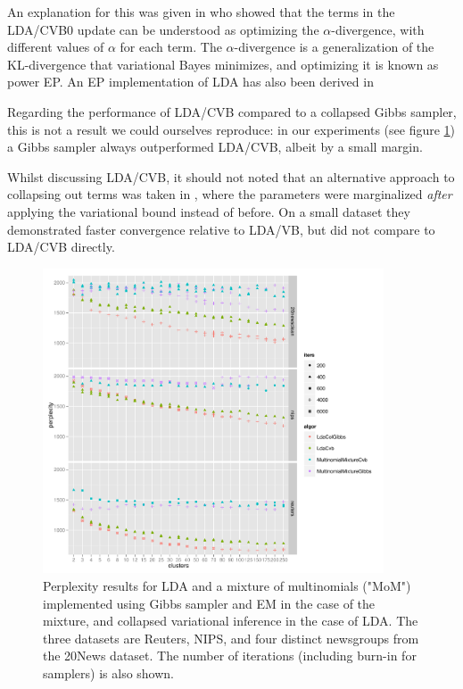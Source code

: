 An explanation for this was given in\cite{Sato2012} who showed that the terms in the LDA/CVB0 update can be understood as optimizing the $\alpha$-divergence\cite{Minka2005}, with different values of $\alpha$ for each term. The $\alpha$-divergence is a generalization of the KL-divergence that variational Bayes minimizes, and optimizing it is known as power EP. An EP implementation of LDA has also been derived in \cite{Minka2002}

Regarding the performance of LDA/CVB compared to a collapsed Gibbs sampler, this is not a result we could ourselves reproduce: in our experiments (see figure \ref{fig:nip-reuters-20news-tests}) a Gibbs sampler always outperformed LDA/CVB, albeit by a small margin.

Whilst discussing LDA/CVB, it should not noted that an alternative approach to collapsing out terms was taken in \cite{Hensman2012}, where the parameters were marginalized \emph{after} applying the variational bound instead of before. On a small dataset they demonstrated faster convergence relative to LDA/VB, but did not compare to LDA/CVB directly.


\begin{figure}
  \centering
    \includegraphics[width=0.9\textwidth]{plots/results-2013-03-18.pdf}
  \caption{Perplexity results for LDA and a mixture of multinomials ("MoM") implemented using Gibbs sampler and EM in the case of the mixture, and collapsed variational inference in the case of LDA. The three datasets are Reuters, NIPS, and four distinct newsgroups from the 20News dataset. The number of iterations (including burn-in for samplers) is also shown.}
  \label{fig:nip-reuters-20news-tests}
\end{figure}

